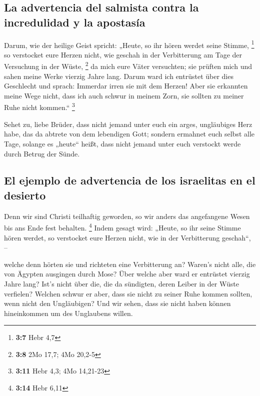 \hypertarget{la-advertencia-del-salmista-contra-la-incredulidad-y-la-apostasuxeda}{%
\subsection{La advertencia del salmista contra la incredulidad y la
apostasía}\label{la-advertencia-del-salmista-contra-la-incredulidad-y-la-apostasuxeda}}

 Darum, wie der heilige Geist spricht: „Heute, so ihr
hören werdet seine Stimme, \footnote{\textbf{3:7} Hebr 4,7}
 so verstocket eure Herzen nicht, wie geschah in der
Verbitterung am Tage der Versuchung in der Wüste, \footnote{\textbf{3:8}
  2Mo 17,7; 4Mo 20,2-5}  da mich eure Väter versuchten;
sie prüften mich und sahen meine Werke vierzig Jahre lang.
 Darum ward ich entrüstet über dies Geschlecht und
sprach: Immerdar irren sie mit dem Herzen! Aber sie erkannten meine Wege
nicht,  dass ich auch schwur in meinem Zorn, sie sollten
zu meiner Ruhe nicht kommen.`` \footnote{\textbf{3:11} Hebr 4,3; 4Mo
  14,21-23}

 Sehet zu, liebe Brüder, dass nicht jemand unter euch ein
arges, ungläubiges Herz habe, das da abtrete von dem lebendigen Gott;
 sondern ermahnet euch selbst alle Tage, solange es
„heute`` heißt, dass nicht jemand unter euch verstockt werde durch
Betrug der Sünde.

\hypertarget{el-ejemplo-de-advertencia-de-los-israelitas-en-el-desierto}{%
\subsection{El ejemplo de advertencia de los israelitas en el
desierto}\label{el-ejemplo-de-advertencia-de-los-israelitas-en-el-desierto}}

 Denn wir sind Christi teilhaftig geworden, so wir anders
das angefangene Wesen bis ans Ende fest behalten. \footnote{\textbf{3:14}
  Hebr 6,11}  Indem gesagt wird: „Heute, so ihr seine
Stimme hören werdet, so verstocket eure Herzen nicht, wie in der
Verbitterung geschah``, --

 welche denn hörten sie und richteten eine Verbitterung
an? Waren's nicht alle, die von Ägypten ausgingen durch Mose?
 Über welche aber ward er entrüstet vierzig Jahre lang?
Ist's nicht über die, die da sündigten, deren Leiber in der Wüste
verfielen?  Welchen schwur er aber, dass sie nicht zu
seiner Ruhe kommen sollten, wenn nicht den Ungläubigen? 
Und wir sehen, dass sie nicht haben können hineinkommen um des
Unglaubens willen.

